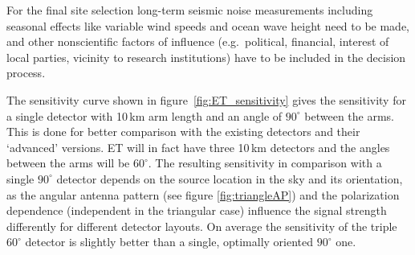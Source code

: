For the final site selection long-term seismic noise measurements including 
seasonal effects like variable wind speeds and ocean wave height need to be made, 
and other nonscientific factors of influence (e.g.\ political, financial, interest of local 
parties, vicinity to research institutions) have to be included in the decision process.

The sensitivity curve shown in figure~\ref{fig:ET_sensitivity} gives the sensitivity for 
a single detector with 10\,km arm length and an angle of $90^{\circ}$ between the 
arms. This is done for better comparison with the existing detectors and their 
`advanced' versions. ET will in fact have three 10\,km detectors and the angles 
between the arms will be $60^{\circ}$. The resulting sensitivity in comparison with 
a single $90^{\circ}$ detector depends on the source location in the sky and its 
orientation, as the angular antenna pattern (see figure \ref{fig:triangleAP}) and the 
polarization dependence (independent in the triangular case) influence the signal 
strength differently for different detector layouts. On average the sensitivity of the 
triple $60^{\circ}$ detector is slightly better than a single, optimally oriented $90^{\circ}$ one.


